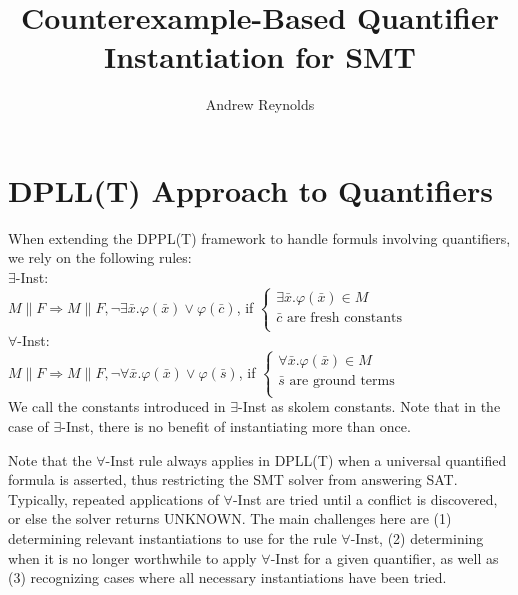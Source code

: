 \documentclass{llncs}
\begin{document}
\pagestyle{plain}

\title{Counterexample-Based Quantifier Instantiation for SMT}

\author{Andrew Reynolds}

\date{}

\maketitle
\thispagestyle{empty}

\section{DPLL(T) Approach to Quantifiers}

When extending the DPPL(T) framework to handle formuls involving quantifiers, we rely on the following rules: \\

\noindent $\exists$-Inst: \\

$M \parallel F \Longrightarrow M \parallel F, \neg \exists \bar{x}. \varphi( \bar{ x } ) \vee \varphi( \bar{ c } )$, if   
$\begin{cases}
  \exists \bar{x}. \varphi( \bar{ x } ) \in M \\
  \bar{ c } \text{ are fresh constants} \\
\end{cases}$ \\

\noindent $\forall$-Inst: \\

$M \parallel F \Longrightarrow M \parallel F, \neg \forall \bar{x}. \varphi( \bar{ x } ) \vee \varphi( \bar{ s } )$, if   
$\begin{cases}
  \forall \bar{x}. \varphi( \bar{ x } ) \in M \\
  \bar{ s } \text{ are ground terms} \\
\end{cases}$ \\

We call the constants introduced in $\exists$-Inst as skolem constants.
Note that in the case of $\exists$-Inst, there is no benefit of instantiating more than once.

Note that the $\forall$-Inst rule always applies in DPLL(T) when a universal quantified formula is asserted, thus restricting the SMT solver from answering SAT.
Typically, repeated applications of $\forall$-Inst are tried until a conflict is discovered, or else the solver returns UNKNOWN.
The main challenges here are (1) determining relevant instantiations to use for the rule $\forall$-Inst, (2) determining when it is no longer worthwhile to apply $\forall$-Inst for a given quantifier, as well as (3) recognizing cases where all necessary instantiations have been tried.
\end{document}
